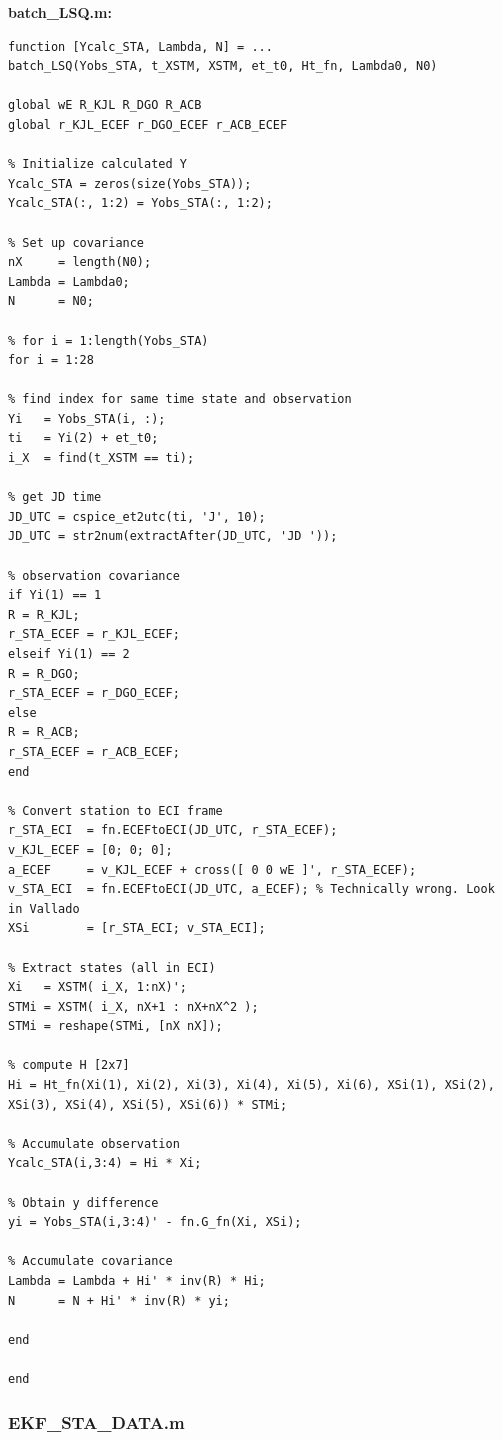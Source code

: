 \documentclass[conf]{new-aiaa}
\begin{document}
\textbf{batch\_LSQ.m:}
\begin{lstlisting}
function [Ycalc_STA, Lambda, N] = ... 
batch_LSQ(Yobs_STA, t_XSTM, XSTM, et_t0, Ht_fn, Lambda0, N0)

global wE R_KJL R_DGO R_ACB 
global r_KJL_ECEF r_DGO_ECEF r_ACB_ECEF 

% Initialize calculated Y 
Ycalc_STA = zeros(size(Yobs_STA)); 
Ycalc_STA(:, 1:2) = Yobs_STA(:, 1:2); 

% Set up covariance 
nX     = length(N0); 
Lambda = Lambda0; 
N      = N0; 

% for i = 1:length(Yobs_STA)
for i = 1:28

% find index for same time state and observation 
Yi   = Yobs_STA(i, :); 
ti   = Yi(2) + et_t0; 
i_X  = find(t_XSTM == ti); 

% get JD time 
JD_UTC = cspice_et2utc(ti, 'J', 10); 
JD_UTC = str2num(extractAfter(JD_UTC, 'JD ')); 

% observation covariance 
if Yi(1) == 1
R = R_KJL; 
r_STA_ECEF = r_KJL_ECEF; 
elseif Yi(1) == 2
R = R_DGO; 
r_STA_ECEF = r_DGO_ECEF; 
else 
R = R_ACB; 
r_STA_ECEF = r_ACB_ECEF; 
end 

% Convert station to ECI frame 
r_STA_ECI  = fn.ECEFtoECI(JD_UTC, r_STA_ECEF); 
v_KJL_ECEF = [0; 0; 0]; 
a_ECEF     = v_KJL_ECEF + cross([ 0 0 wE ]', r_STA_ECEF); 
v_STA_ECI  = fn.ECEFtoECI(JD_UTC, a_ECEF); % Technically wrong. Look in Vallado 
XSi        = [r_STA_ECI; v_STA_ECI]; 

% Extract states (all in ECI) 
Xi   = XSTM( i_X, 1:nX)'; 
STMi = XSTM( i_X, nX+1 : nX+nX^2 ); 
STMi = reshape(STMi, [nX nX]); 

% compute H [2x7]
Hi = Ht_fn(Xi(1), Xi(2), Xi(3), Xi(4), Xi(5), Xi(6), XSi(1), XSi(2), XSi(3), XSi(4), XSi(5), XSi(6)) * STMi; 

% Accumulate observation 
Ycalc_STA(i,3:4) = Hi * Xi; 

% Obtain y difference 
yi = Yobs_STA(i,3:4)' - fn.G_fn(Xi, XSi); 

% Accumulate covariance 
Lambda = Lambda + Hi' * inv(R) * Hi; 
N      = N + Hi' * inv(R) * yi; 

end 

end 
\end{lstlisting}

\subsubsection{EKF\_STA\_DATA.m}
\end{document}
